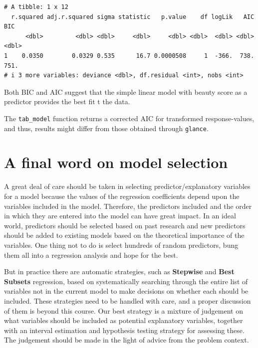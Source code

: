 \documentclass[
  letterpaper,
  DIV=11,
  numbers=noendperiod]{scrartcl}
\begin{document}
\begin{verbatim}
# A tibble: 1 x 12
  r.squared adj.r.squared sigma statistic   p.value    df logLik   AIC   BIC
      <dbl>         <dbl> <dbl>     <dbl>     <dbl> <dbl>  <dbl> <dbl> <dbl>
1    0.0350        0.0329 0.535      16.7 0.0000508     1  -366.  738.  751.
# i 3 more variables: deviance <dbl>, df.residual <int>, nobs <int>
\end{verbatim}

Both BIC and AIC suggest that the simple linear model with beauty score
as a predictor provides the best fit t the data.

\begin{tcolorbox}[enhanced jigsaw, colback=white, toptitle=1mm, bottomrule=.15mm, colbacktitle=quarto-callout-note-color!10!white, breakable, title=\textcolor{quarto-callout-note-color}{\faInfo}\hspace{0.5em}{Note}, colframe=quarto-callout-note-color-frame, opacitybacktitle=0.6, toprule=.15mm, arc=.35mm, coltitle=black, leftrule=.75mm, bottomtitle=1mm, titlerule=0mm, opacityback=0, rightrule=.15mm, left=2mm]

The \texttt{tab\_model} function returns a corrected AIC for transformed
response-values, and thus, results might differ from those obtained
through \texttt{glance}.

\end{tcolorbox}

\section{A final word on model
selection}\label{a-final-word-on-model-selection}

A great deal of care should be taken in selecting predictor/explanatory
variables for a model because the values of the regression coefficients
depend upon the variables included in the model. Therefore, the
predictors included and the order in which they are entered into the
model can have great impact. In an ideal world, predictors should be
selected based on past research and new predictors should be added to
existing models based on the theoretical importance of the variables.
One thing not to do is select hundreds of random predictors, bung them
all into a regression analysis and hope for the best.

But in practice there are automatic strategies, such as
\textbf{Stepwise} and \textbf{Best Subsets} regression, based on
systematically searching through the entire list of variables not in the
current model to make decisions on whether each should be included.
These strategies need to be handled with care, and a proper discussion
of them is beyond this course. Our best strategy is a mixture of
judgement on what variables should be included as potential explanatory
variables, together with an interval estimation and hypothesis testing
strategy for assessing these. The judgement should be made in the light
of advice from the problem context.
\end{document}
